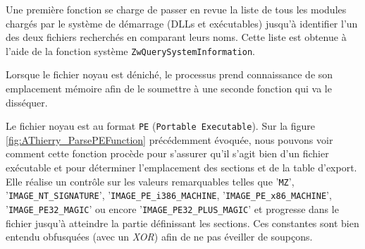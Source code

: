 Une première fonction se charge de passer en revue la liste de tous les modules chargés par le système de démarrage (DLLs et exécutables) jusqu’à identifier l'un des deux fichiers recherchés en comparant leurs noms. Cette liste est obtenue à l'aide de la fonction système \texttt{ZwQuerySystemInformation}. 

Lorsque le fichier noyau est déniché, le processus prend connaissance de son emplacement mémoire afin de le soumettre à une seconde fonction qui va le disséquer. 

Le fichier noyau est au format \texttt{PE} (\texttt{Portable Executable}). Sur la figure \ref{fig:AThierry_ParsePEFunction} précédemment évoquée, nous pouvons voir comment cette fonction procède pour s'assurer qu'il s'agit bien d'un fichier exécutable et pour déterminer l'emplacement des sections et de la table d'export. Elle réalise un contrôle sur les valeurs remarquables telles que '\texttt{MZ}', '\texttt{IMAGE\_NT\_SIGNATURE}', '\texttt{IMAGE\_PE\_i386\_MACHINE}, '\texttt{IMAGE\_PE\_x86\_MACHINE}', '\texttt{IMAGE\_PE32\_MAGIC}' ou encore '\texttt{IMAGE\_PE32\_PLUS\_MAGIC}' et progresse dans le fichier jusqu'à atteindre la partie définissant les sections. Ces constantes sont bien entendu obfusquées (avec un {\em XOR}) afin de ne pas éveiller de soupçons.

